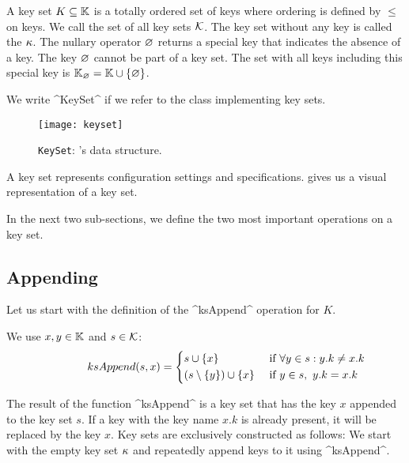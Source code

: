 \begin{definition}
A key set $K \subseteq \mathbb{K}$ is a totally ordered set of keys where ordering is defined by $\leq$ on keys.
We call the set of all key sets $\mathcal{K}$.
The key set without any key is called the  $\kappa$.
The nullary operator $\varnothing$ returns a special key that indicates the absence of a key.
The key $\varnothing$ cannot be part of a key set.
The set with all keys including this special key is $\mathbb{K}_\varnothing = \mathbb{K} \cup \{\varnothing\}$.
\end{definition}

We write ^KeySet^ if we refer to the class implementing key sets.

\begin{figure}[htp]
\centering
\texttt{[image: keyset]}
\caption{\texttt{KeySet}: \elektra{}'s data structure.}
\label{fig:keyset}
\end{figure}

A key set represents configuration settings and specifications.
 gives us a visual representation of a key set.

In the next two sub-sections, we define the two most important operations on a key set.


\subsection{Appending}

Let us start with the definition of the ^ksAppend^ operation for $K$.

\begin{definition}
We use $x, y \in \mathbb{K}$ and $s \in \mathcal{K}$:
\begin{align*}
\phantom{holahola}
ksAppend(s, x) =
\begin{dcases}
s \cup \{ x \}                     & \text{ if } \forall y \in s : y.k \neq x.k \\
(s \setminus \{ y \}) \cup \{ x \} & \text{ if } y \in s,\ y.k = x.k
\end{dcases}
\end{align*}
\end{definition}

The result of the function ^ksAppend^ is a key set that has the key $x$ appended to the key set $s$.
If a key with the key name $x.k$ is already present, it will be replaced by the key $x$.
Key sets are exclusively constructed as follows:
We start with the empty key set $\kappa$ and repeatedly append keys to it using ^ksAppend^.

